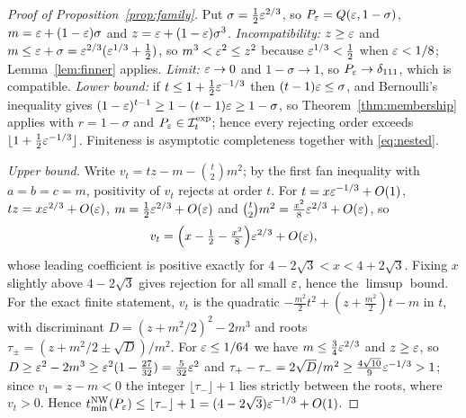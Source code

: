 \begin{proof}[Proof of Proposition~\ref{prop:family}]
Put $\sigma=\tfrac12\varepsilon^{2/3}$, so $P_\varepsilon=Q(\varepsilon,1-\sigma)$, $m=\varepsilon+(1-\varepsilon)\sigma$ and $z=\varepsilon+(1-\varepsilon)\sigma^3$. \emph{Incompatibility:} $z\ge\varepsilon$ and $m\le\varepsilon+\sigma=\varepsilon^{2/3}(\varepsilon^{1/3}+\tfrac12)$, so $m^3<\varepsilon^2\le z^2$ because $\varepsilon^{1/3}<\tfrac12$ when $\varepsilon<1/8$; Lemma~\ref{lem:finner} applies. \emph{Limit:} $\varepsilon\to0$ and $1-\sigma\to1$, so $P_\varepsilon\to\delta_{111}$, which is compatible. \emph{Lower bound:} if $t\le1+\tfrac12\varepsilon^{-1/3}$ then $(t-1)\varepsilon\le\sigma$, and Bernoulli's inequality gives $(1-\varepsilon)^{t-1}\ge1-(t-1)\varepsilon\ge1-\sigma$, so Theorem~\ref{thm:membership} applies with $r=1-\sigma$ and $P_\varepsilon\in\mathcal I^{\mathrm{exp}}_t$; hence every rejecting order exceeds $\lfloor1+\tfrac12\varepsilon^{-1/3}\rfloor$. Finiteness is asymptotic completeness together with \eqref{eq:nested}.

\emph{Upper bound.} Write $v_t=tz-m-\binom t2m^2$; by the first fan inequality with $a=b=c=m$, positivity of $v_t$ rejects at order $t$. For $t=x\varepsilon^{-1/3}+O(1)$, $tz=x\varepsilon^{2/3}+O(\varepsilon)$, $m=\tfrac12\varepsilon^{2/3}+O(\varepsilon)$ and $\binom t2m^2=\tfrac{x^2}8\varepsilon^{2/3}+O(\varepsilon)$, so
\[
v_t=\Bigl(x-\tfrac12-\tfrac{x^2}8\Bigr)\varepsilon^{2/3}+O(\varepsilon),
\]
whose leading coefficient is positive exactly for $4-2\sqrt3<x<4+2\sqrt3$. Fixing $x$ slightly above $4-2\sqrt3$ gives rejection for all small $\varepsilon$, hence the $\limsup$ bound. For the exact finite statement, $v_t$ is the quadratic $-\tfrac{m^2}2t^2+(z+\tfrac{m^2}2)t-m$ in $t$, with discriminant $D=(z+m^2/2)^2-2m^3$ and roots $\tau_\pm=(z+m^2/2\pm\sqrt D)/m^2$. For $\varepsilon\le1/64$ we have $m\le\tfrac34\varepsilon^{2/3}$ and $z\ge\varepsilon$, so $D\ge\varepsilon^2-2m^3\ge\varepsilon^2(1-\tfrac{27}{32})=\tfrac5{32}\varepsilon^2$ and $\tau_+-\tau_-=2\sqrt D/m^2\ge\tfrac{4\sqrt{10}}9\varepsilon^{-1/3}>1$; since $v_1=z-m<0$ the integer $\lfloor\tau_-\rfloor+1$ lies strictly between the roots, where $v_t>0$. Hence $t_{\min}^{\mathrm{NW}}(P_\varepsilon)\le\lfloor\tau_-\rfloor+1=(4-2\sqrt3)\varepsilon^{-1/3}+O(1)$.

\end{proof}
